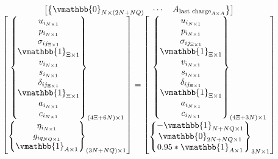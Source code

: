\documentclass[letterpaper, 10pt, conference]{IEEEtran}
\begin{document}
\begin{equation}
\begin{array}{c}
\begin{bmatrix}
\begin{Bmatrix}
            \vmathbb{0}_{N \times (2N + NQ)}           & \cdots                                     & A_{\textrm{last charge}_{A \times A}} \\
        \end{Bmatrix}
    \end{bmatrix}  \\
    \begin{bmatrix}
        \begin{Bmatrix}
            u_{i_{N \times 1}} \\ p_{i_{N \times 1}} \\ \sigma_{ij_{\Xi \times 1}} \\ \vmathbb{1}_{\Xi \times 1} \\ v_{i_{N \times 1}} \\ s_{i_{N \times 1}} \\ \delta_{ij_{\Xi \times 1}} \\ \vmathbb{1}_{\Xi \times 1} \\ a_{i_{N \times 1}} \\ c_{i_{N \times 1}} \\
        \end{Bmatrix}_{(4\Xi + 6N) \times 1} \\
        \begin{Bmatrix}
            \eta_{i_{N \times 1}} \\
            g_{iq_{NQ \times 1}} \\
            \vmathbb{1}_{A \times 1} \\
        \end{Bmatrix}_{(3N + NQ) \times 1}
    \end{bmatrix}
    =
    \begin{bmatrix}
        \begin{Bmatrix}
            u_{i_{N \times 1}} \\ p_{i_{N \times 1}} \\ \sigma_{ij_{\Xi \times 1}} \\ \vmathbb{1}_{\Xi \times 1} \\ v_{i_{N \times 1}} \\ s_{i_{N \times 1}} \\ \delta_{ij_{\Xi \times 1}} \\ \vmathbb{1}_{\Xi \times 1} \\ a_{i_{N \times 1}} \\ c_{i_{N \times 1}} \\
        \end{Bmatrix}_{(4\Xi + 3N) \times 1} \\
        \begin{Bmatrix}
            -\vmathbb{1}_{N + NQ \times 1} \\
            \vmathbb{0}_{2N + NQ \times 1} \\
            0.95*\vmathbb{1}_{A \times 1} \\
        \end{Bmatrix}_{3N \times 1}
    \end{bmatrix}
\end{array}
\end{equation}
\end{document}
